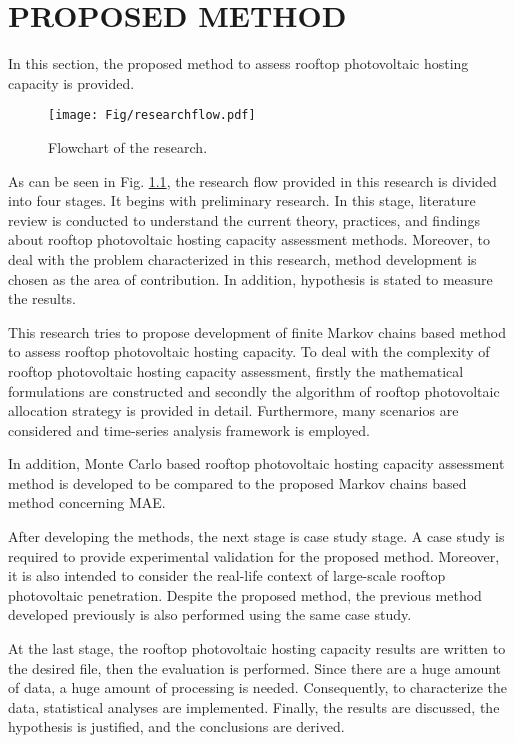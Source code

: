 \chapter{PROPOSED METHOD}
In this section, the proposed method to assess rooftop photovoltaic hosting capacity is provided.
\begin{figure}[!b]
	\centering
	\vspace{-10pt}
	\texttt{[image: Fig/researchflow.pdf]}
	\vspace{-15pt}
	\caption{Flowchart of the research.}
	\label{fig-researchflow}
\end{figure}
As can be seen in Fig. \ref{fig-researchflow}, the research flow provided in this research is divided into four stages. It begins with preliminary research. In this stage, literature review is conducted to understand the current theory, practices, and findings about rooftop photovoltaic hosting capacity assessment methods. Moreover, to deal with the problem characterized in this research, method development is chosen as the area of contribution. In addition, hypothesis is stated to measure the results. 

This research tries to propose development of finite Markov chains based method to assess rooftop photovoltaic hosting capacity. To deal with the complexity of rooftop photovoltaic hosting capacity assessment, firstly the mathematical formulations are constructed and secondly the algorithm of rooftop photovoltaic allocation strategy is provided in detail. Furthermore, many scenarios are considered and time-series analysis framework is employed.

In addition, Monte Carlo based rooftop photovoltaic hosting capacity assessment method is developed to be compared to the proposed Markov chains based method concerning MAE.

After developing the methods, the next stage is case study stage. A case study is required to provide experimental validation for the proposed method. Moreover, it is also intended to consider the real-life context of large-scale rooftop photovoltaic penetration. Despite the proposed method, the previous method developed previously is also performed using the same case study.

At the last stage, the rooftop photovoltaic hosting capacity results are written to the desired file, then the evaluation is performed. Since there are a huge amount of data, a huge amount of processing is needed. Consequently, to characterize the data, statistical analyses are implemented. Finally, the results are discussed, the hypothesis is justified, and the conclusions are derived.
